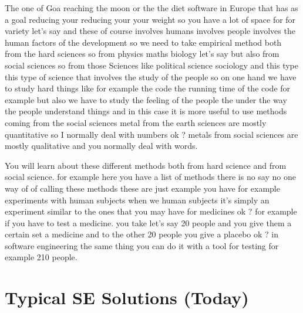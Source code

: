 \documentclass[conference, compsoc, twoside]{IEEEtran}
\begin{document}
The one of Goa reaching the moon or the the diet software in Europe that has as a goal reducing your reducing your your weight so you have a lot of space for for variety let's say and these of course involves humans involves people involves the human factors of the development so we need to take empirical method both from the hard sciences so from physics maths biology let's say but also from social sciences so from those Sciences like political science sociology and this type this type of science that involves the study of the people so on one hand we have to study hard things like 
for example the code the running time of the code 
for example but also we have to study the feeling of the people the under the way the people understand things and in this case it is more useful to use methods coming from the social sciences metal from the earth sciences are mostly quantitative 
so I normally deal with numbers ok ? metals from social sciences are mostly qualitative and you normally deal with words. 

You will learn about these different methods both from hard science and from social science.
for example here you have a list of methods there is no say no one way of of calling these methods these are just example you have 
for example experiments with human subjects when we human subjects it's simply an experiment similar to the ones that you may have for medicines ok ? 
for example if you have to test a medicine.
you take let's say 20 people and you give them a certain set a medicine and to the other 20 people you give a placebo ok ? in software engineering the same thing you can do it with a tool for testing 
for example 210 people. 


\section{Typical SE Solutions (Today)} %
\label{sec:typical_se_solutions_today}
\end{document}
